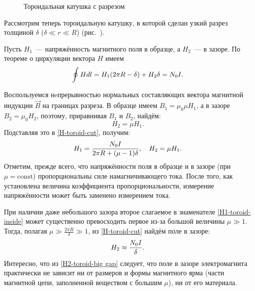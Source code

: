 \begin{wrapfigure}{o}{0.35\textwidth}
    \centering
    \caption{Тороидальная катушка с разрезом}
\end{wrapfigure}

Рассмотрим теперь тороидальную катушку, в которой сделан узкий разрез толщиной
$\delta$ ($\delta \ll r \ll R$) (рис.~).

Пусть $H_1$~--- напряжённость магнитного поля в
образце, а $H_2$~--- в зазоре. По теореме о циркуляции вектора $H$ имеем
\begin{equation}
	\eqmark{H-toroid-cut}
	\oint {Hdl} = H_1 (2\pi R - \delta) + H_2 \delta  = N_0 I.
\end{equation}

Воспользуемся нeпрерывностью нормальных составляющих вектора магнитной
индукции $\vec{B}$ на границах разреза. В образце имеем $B_1 = \mu_0 \mu H_1$,
а в зазоре $B_2 = \mu_0 H_2$, поэтому, приравнивая $B_1$ и $B_2$, найдём:
\begin{equation*}H_2 = \mu H_1.\end{equation*}
Подставляя это в \eqref{H-toroid-cut}, получим:
\begin{equation}
	\eqmark{H1-toroid-inside}
	H_1 = \frac{N_0 I}{2\pi R + (\mu - 1)\delta},\quad H_2 = \mu H_1.
\end{equation}
Отметим, прежде всего, что напряжённости поля в образце и в зазоре
(при $\mu = \mathrm{const}$) пропорциональны силе намагничивающего тока.
После того, как установлена величина коэффициента
пропорциональности, измерение напряжённости может быть заменено измерением тока.

При наличии даже небольшого зазора второе слагаемое в знаменателе
\eqref{H1-toroid-inside} может существенно превосходить первое из-за большой величины
$\mu\gg1$. Тогда, полагая $\mu\gg \frac{2\pi R}{\delta}\gg 1$, из
\eqref{H-toroid-cut} найдём поле в зазоре:
\begin{equation}
	\eqmark{H2-toroid-big gap}
	H_2 \approx \frac{N_0 I}{\delta}.
\end{equation}
Интересно, что из \eqref{H2-toroid-big gap} следует, что поле в зазоре
электромагнита практически не зависит ни от размеров и формы магнитного ярма (части
магнитной цепи, заполненной веществом с большим $\mu$), ни от его материала.




